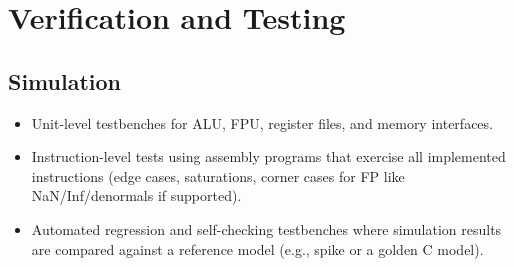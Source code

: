 \documentclass[11pt,a4paper]{article}
\begin{document}
\section{Verification and Testing}
\subsection{Simulation}
\begin{itemize}
\item Unit-level testbenches for ALU, FPU, register files, and memory interfaces.
\item Instruction-level tests using assembly programs that exercise all implemented instructions (edge cases, saturations, corner cases for FP like NaN/Inf/denormals if supported).
\item Automated regression and self-checking testbenches where simulation results are compared against a reference model (e.g., spike or a golden C model).
\end{itemize}
\end{document}
